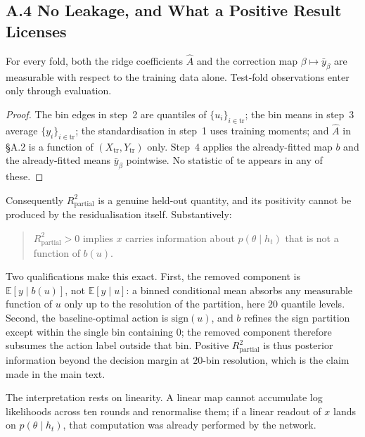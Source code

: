 \subsection{A.4 No Leakage, and What a Positive Result Licenses}

\begin{proposition}
For every fold, both the ridge coefficients $\hat A$ and the correction map
$\beta\mapsto\bar y_\beta$ are measurable with respect to the training data
alone. Test-fold observations enter only through evaluation.
\end{proposition}

\begin{proof}
The bin edges in step~2 are quantiles of $\{u_i\}_{i\in\mathrm{tr}}$; the bin
means in step~3 average $\{y_i\}_{i\in\mathrm{tr}}$; the standardisation in
step~1 uses training moments; and $\hat A$ in \S A.2 is a function of
$(X_{\mathrm{tr}},Y_{\mathrm{tr}})$ only. Step~4 applies the already-fitted map
$b$ and the already-fitted means $\bar y_\beta$ pointwise. No statistic of
$\mathrm{te}$ appears in any of these. \qedhere
\end{proof}

Consequently $R^2_{\mathrm{partial}}$ is a genuine held-out quantity, and its
positivity cannot be produced by the residualisation itself. Substantively:

\begin{quote}
$R^2_{\mathrm{partial}}>0$ implies $x$ carries information about
$p(\theta\mid h_t)$ that is not a function of $b(u)$.
\end{quote}

Two qualifications make this exact. First, the removed component is
$\mathbb{E}[y\mid b(u)]$, not $\mathbb{E}[y\mid u]$: a binned conditional mean
absorbs any measurable function of $u$ only up to the resolution of the
partition, here $20$ quantile levels. Second, the baseline-optimal action is
$\mathrm{sign}(u)$, and $b$ refines the sign partition except within the single
bin containing $0$; the removed component therefore subsumes the action label
outside that bin. Positive $R^2_{\mathrm{partial}}$ is thus posterior
information beyond the decision margin at $20$-bin resolution, which is the
claim made in the main text.

The interpretation rests on linearity. A linear map cannot accumulate log
likelihoods across ten rounds and renormalise them; if a linear readout of $x$
lands on $p(\theta\mid h_t)$, that computation was already performed by the
network.

